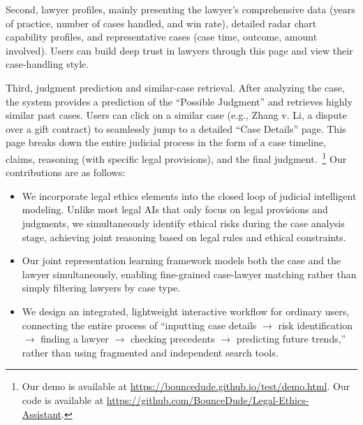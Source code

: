 \documentclass[conference]{IEEEtran}
\begin{document}
Second, lawyer profiles, mainly presenting the lawyer's comprehensive data (years of practice, number of cases handled, and win rate), detailed radar chart capability profiles, and representative cases (case time, outcome, amount involved). Users can build deep trust in lawyers through this page and view their case-handling style.

Third, judgment prediction and similar-case retrieval. After analyzing the case, the system provides a prediction of the ``Possible Judgment'' and retrieves highly similar past cases. Users can click on a similar case (e.g., Zhang v. Li, a dispute over a gift contract) to seamlessly jump to a detailed ``Case Details'' page. This page breaks down the entire judicial process in the form of a case timeline, claims, reasoning (with specific legal provisions), and the final judgment.~\footnote{Our demo is available at \url{https://bouncedude.github.io/test/demo.html}. Our code is available at \url{https://github.com/BounceDude/Legal-Ethics-Assistant}.}
Our contributions are as follows:
\begin{itemize}
    \item We incorporate legal ethics elements into the closed loop of judicial intelligent modeling. Unlike most legal AIs that only focus on legal provisions and judgments, we simultaneously identify ethical risks during the case analysis stage, achieving joint reasoning based on legal rules and ethical constraints.
    \item Our joint representation learning framework models both the case and the lawyer simultaneously, enabling fine-grained case-lawyer matching rather than simply filtering lawyers by case type.
    \item We design an integrated, lightweight interactive workflow for ordinary users, connecting the entire process of ``inputting case details $\rightarrow$ risk identification $\rightarrow$ finding a lawyer $\rightarrow$ checking precedents $\rightarrow$ predicting future trends,'' rather than using fragmented and independent search tools.
\end{itemize}
\end{document}
